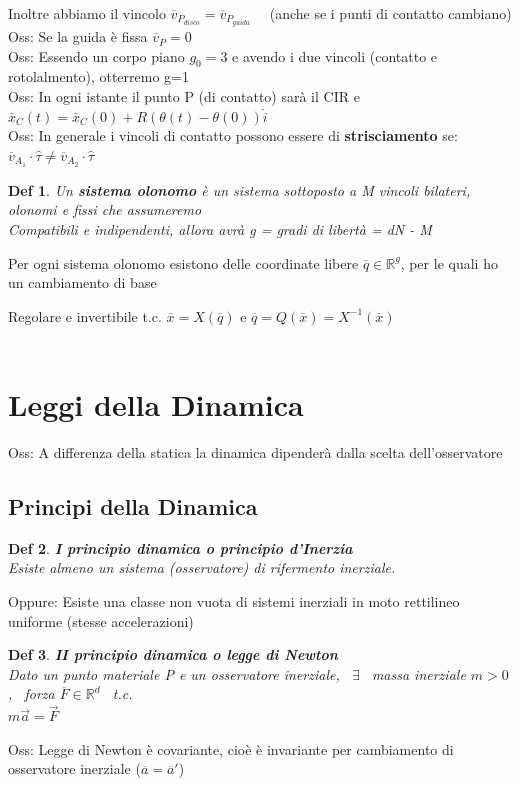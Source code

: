 \documentclass{article}
\theoremstyle{unnumbered}
\newtheorem* {theoremT}{Def}
\theoremstyle{unnumbered1}
\newenvironment{defi}{\begin{gBox}\begin{theoremT}}{\end{theoremT}\end{gBox}}
\begin{document}
Inoltre abbiamo il vincolo $\overline{v}_{P_{disco}}=\overline{v}_{P_{guida}}$ \ \ (anche se i punti di contatto cambiano) \\
Oss: Se la guida è fissa $\overline{v}_P=0$\\
Oss: Essendo un corpo piano $g_0=3$ e avendo i due vincoli (contatto e rotolalmento), otterremo g=1 \\
Oss: In ogni istante il punto P (di contatto) sarà il CIR e \ \  $\overline{x}_C(t)=\overline{x}_C(0) + R(\theta(t) - \theta(0))\hat{i}$ \\
Oss: In generale i vincoli di contatto possono essere di \textbf{strisciamento} se: $\overline{v}_{A_1} \cdot \hat{\tau} \neq \overline{v}_{A_2} \cdot \hat{\tau}$ \\
%
%
%
\begin{defi}
Un \textbf{sistema olonomo} è un sistema sottoposto a M vincoli bilateri, olonomi e fissi che assumeremo\\
Compatibili e indipendenti, allora avrà g = gradi di libertà = dN - M 
\end{defi}
%
%
%
Per ogni sistema olonomo esistono delle coordinate libere $\overline{q} \in \mathbb{R}^g$, per le quali ho un cambiamento di base

Regolare e invertibile t.c. $\overline{x}=X(\overline{q})$ e $\overline{q}=Q(\overline{x})=X^{-1}(\overline{x})$ \\ \\
%
%
%


\newpage

\section{Leggi della Dinamica}

Oss: A differenza della statica la dinamica dipenderà dalla scelta dell'osservatore
\subsection{Principi della Dinamica}
%
%
\begin{defi}
\textbf{I principio dinamica o principio d'Inerzia}\\
Esiste almeno un sistema (osservatore) di rifermento inerziale.
\end{defi}
Oppure: Esiste una classe non vuota di sistemi inerziali in moto rettilineo uniforme (stesse accelerazioni)\\
%
%
%
\begin{defi}
\textbf{II principio dinamica o legge di Newton}\\
Dato un punto materiale P e un osservatore inerziale, \ $\exists$ \ massa inerziale $m>0$, \ forza $\overline{F}\in\mathbb{R}^d$ \ t.c. \\
\phantom{} \hspace{2in} $m\overrightarrow{a}=\overrightarrow{F}$
\end{defi}
%
%
Oss: Legge di Newton è covariante, cioè è invariante per cambiamento di osservatore inerziale ($\overline{a}=\overline{a}'$)
\end{document}
